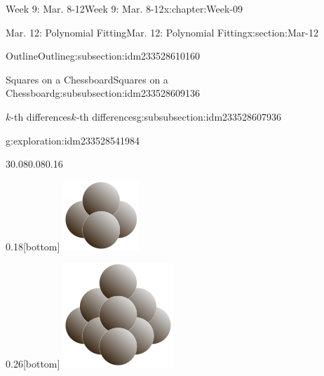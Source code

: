 \documentclass[oneside,10pt,]{book}
\numberwithin{equation}{section}
\begin{document}
\begin{chapterptx}{Week 9: Mar. 8-12}{}{Week 9: Mar. 8-12}{}{}{x:chapter:Week-09}
\begin{sectionptx}{Mar. 12: Polynomial Fitting}{}{Mar. 12: Polynomial Fitting}{}{}{x:section:Mar-12}
\begin{subsectionptx}{Outline}{}{Outline}{}{}{g:subsection:idm233528610160}
\begin{subsubsectionptx}{Squares on a Chessboard}{}{Squares on a Chessboard}{}{}{g:subsubsection:idm233528609136}
\begin{subsubsectionptx}{\(k\)-th differences}{}{\(k\)-th differences}{}{}{g:subsubsection:idm233528607936}
\begin{exploration}{}{g:exploration:idm233528541984}
\begin{sidebyside}{3}{0.08}{0.08}{0.16}
\begin{sbspanel}{0.18}[bottom]
\includegraphics[width=\linewidth]{./img/image-59.svg}
\end{sbspanel}%
\begin{sbspanel}{0.26}[bottom]%
\includegraphics[width=\linewidth]{./img/image-60.svg}
\end{sbspanel}%
\end{sidebyside}%

\end{exploration}
\end{subsubsectionptx}
\end{subsubsectionptx}
\end{subsectionptx}
\end{sectionptx}
\end{chapterptx}
\end{document}
